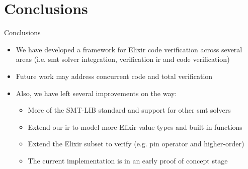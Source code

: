 \documentclass{beamer}
\begin{document}
  \section{Conclusions}
  \begin{frame}{Conclusions}
    \begin{itemize}
      \item \pause We have developed a framework for Elixir code verification across several areas (i.e. \acrshort*{smt} solver integration, verification \gls*{ir} and code verification)
      \item \pause Future work may address concurrent code and total verification
      \item \pause Also, we have left several improvements on the way:
      \begin{itemize}
        \item \pause More of the SMT-LIB standard and support for other \acrshort*{smt} solvers
        \item \pause Extend our \gls*{ir} to model more Elixir value types and built-in functions
        \item \pause Extend the Elixir subset to verify (e.g. pin operator and higher-order)
        \item \pause The current implementation is in an early proof of concept stage
      \end{itemize}
    \end{itemize}
  \end{frame}
  \appendix
  \maketitle
\end{document}
